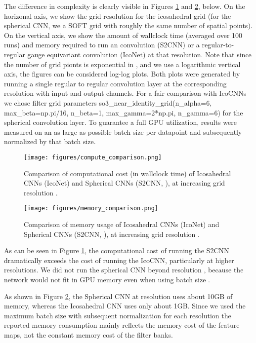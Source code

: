 \documentclass{article}
\begin{document}
The difference in complexity is clearly visible in Figures \ref{fig:compute_comparison} and \ref{fig:memory_comparison}, below.
On the horizonal axis, we show the grid resolution  for the icosahedral grid  (for the spherical CNN, we a SOFT grid with roughly the same number of spatial points).
On the vertical axis, we show the amount of wallclock time (averaged over 100 runs) and memory required to run an  convolution (S2CNN) or a regular-to-regular gauge equivariant convolution (IcoNet) at that resolution.
Note that since the number of grid pionts is exponential in , and we use a logarithmic vertical axis, the figures can be considered log-log plots.
Both plots were generated by running a single regular to regular convolution layer at the corresponding resolution  with  input and output channels.
For a fair comparison with IcoCNNs we chose filter grid parameters so3\_near\_identity\_grid(n\_alpha=6, max\_beta=np.pi/16, n\_beta=1, max\_gamma=2*np.pi, n\_gamma=6) for the spherical convolution layer.
To guarantee a full GPU utilization, results were measured on an as large as possible batch size per datapoint and subsequently normalized by that batch size.

\begin{figure}[h!]
    \centering
    \texttt{[image: figures/compute\_comparison.png]}
    \caption{Comparison of computational cost (in wallclock time) of Icosahedral CNNs (IcoNet) and Spherical CNNs (S2CNN, \cite{cohenSphericalCNNs2018}), at increasing grid resolution .}
    \label{fig:compute_comparison}
\end{figure}

\begin{figure}[h!]
    \centering
    \texttt{[image: figures/memory\_comparison.png]}
    \caption{Comparison of memory usage of Icosahedral CNNs (IcoNet) and Spherical CNNs (S2CNN, \cite{cohenSphericalCNNs2018}), at increasing grid resolution .}
    \label{fig:memory_comparison}
\end{figure}

As can be seen in Figure \ref{fig:compute_comparison}, the computational cost of running the S2CNN dramatically exceeds the cost of running the IcoCNN, particularly at higher resolutions.
We did not run the spherical CNN beyond resolution , because the network would not fit in GPU memory even when using batch size .

As shown in Figure \ref{fig:memory_comparison}, the Spherical CNN at resolution  uses about 10GB of memory, whereas the Icosahedral CNN uses only about 1GB.
Since we used the maximum batch size with subsequent normalization for each resolution the reported memory consumption mainly reflects the memory cost of the feature maps, not the constant memory cost of the filter banks.
\end{document}
